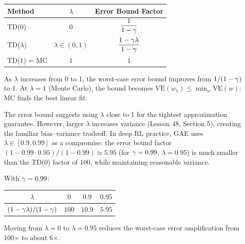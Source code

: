 \documentclass[11pt,a4paper]{article}
\begin{document}
\begin{keyresult}[title={Spectrum of TD($\lambda$) Error Bounds}]
\begin{center}
\begin{tabular}{lcc}
\toprule
\textbf{Method} & $\lambda$ &
  \textbf{Error Bound Factor} \\
\midrule
TD(0) & $0$ & $\dfrac{1}{1-\gamma}$ \\[6pt]
TD($\lambda$) & $\lambda \in (0,1)$ &
  $\dfrac{1-\gamma\lambda}{1-\gamma}$ \\[6pt]
TD(1) = MC & $1$ & $1$ \\
\bottomrule
\end{tabular}
\end{center}
As $\lambda$ increases from 0 to 1, the worst-case error bound
improves from $1/(1-\gamma)$ to 1. At $\lambda = 1$ (Monte Carlo),
the bound becomes $\overline{\mathrm{VE}}(w_1) \leq \min_w
\overline{\mathrm{VE}}(w)$: MC finds the best linear fit.
\end{keyresult}

\begin{rlconnection}[title={Choosing $\lambda$ in Practice}]
The error bound suggests using $\lambda$ close to 1 for the tightest
approximation guarantee. However, larger $\lambda$ increases variance
(Lesson 48, Section 5), creating the familiar bias--variance tradeoff.
In deep RL practice, GAE uses $\lambda \in [0.9, 0.99]$ as a
compromise: the error bound factor
$(1 - 0.99 \cdot 0.95)/(1 - 0.99) \approx 5.95$ (for
$\gamma = 0.99$, $\lambda = 0.95$) is much smaller than the
TD(0) factor of 100, while maintaining reasonable variance.
\end{rlconnection}

\begin{example}
\label{ex:lambda_bounds}
With $\gamma = 0.99$:
\begin{center}
\begin{tabular}{cccc}
\toprule
$\lambda$ & $0$ & $0.9$ & $0.95$ \\
\midrule
$(1-\gamma\lambda)/(1-\gamma)$ & $100$ & $10.9$ & $5.95$ \\
\bottomrule
\end{tabular}
\end{center}
Moving from $\lambda = 0$ to $\lambda = 0.95$ reduces the
worst-case error amplification from 100$\times$ to about 6$\times$.
\end{example}

\end{document}
